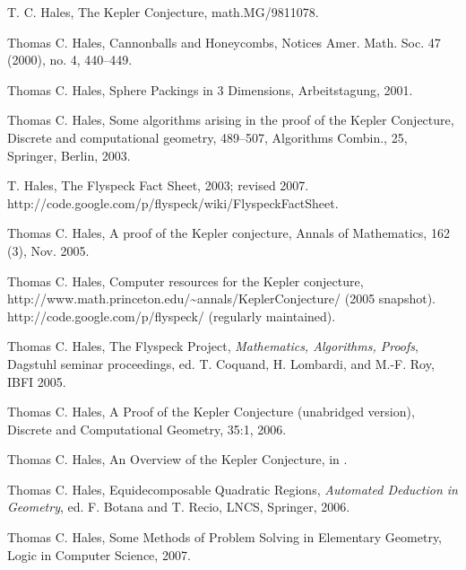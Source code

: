 \begin{thebibliography}{CHMS94}
 T. C. Hales, The Kepler Conjecture, math.MG/9811078.


 Thomas C. Hales, Cannonballs and Honeycombs,
Notices Amer. Math. Soc.  47  (2000),  no. 4, 440--449.

 Thomas C. Hales, Sphere Packings in 3
Dimensions, Arbeitstagung, 2001.

 Thomas C. Hales, Some algorithms arising in
the proof of the Kepler Conjecture, Discrete and computational
geometry, 489--507, Algorithms Combin., 25, Springer, Berlin,
2003.

   T. Hales, The Flyspeck Fact Sheet, 2003; revised
2007. http://code.google.com/p/flyspeck/wiki/FlyspeckFactSheet.


 Thomas C. Hales, A proof of the
Kepler conjecture, Annals of Mathematics, 162 (3), Nov. 2005.

 Thomas C. Hales, Computer resources for the Kepler conjecture, \hfill\break
    http://www.math.princeton.edu/\~\!annals/KeplerConjecture/ (2005 snapshot).
    http://code.google.com/p/flyspeck/ (regularly maintained).

  Thomas C. Hales, The Flyspeck Project, 
{\it Mathematics, Algorithms, Proofs}, Dagstuhl seminar proceedings, 
ed. T. Coquand, H. Lombardi, and M.-F. Roy,
IBFI 2005.

 Thomas C. Hales, A Proof of the
Kepler Conjecture (unabridged version), 
Discrete and Computational Geometry, 35:1, 2006.

 Thomas C. Hales, An
Overview of the Kepler Conjecture, in \cite{DCG}.

 Thomas C. Hales, Equidecomposable Quadratic Regions,
{\it Automated Deduction in Geometry}, ed. F. Botana and T. Recio,
LNCS, Springer, 2006.

 Thomas C. Hales,  Some Methods of Problem
Solving in Elementary Geometry, Logic in Computer Science, 2007.


\end{thebibliography}

